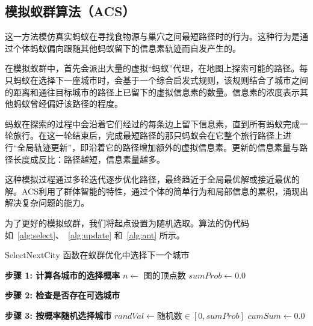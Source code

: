 \subsection{模拟蚁群算法（ACS）}

这一方法模仿真实蚂蚁在寻找食物源与巢穴之间最短路径时的行为。这种行为是通过个体蚂蚁偏向跟随其他蚂蚁留下的信息素轨迹而自发产生的。\cite{dorigo1997ant}

在模拟蚁群中，首先会派出大量的虚拟``蚂蚁''代理，在地图上探索可能的路径。每只蚂蚁在选择下一座城市时，会基于一个综合启发式规则，该规则结合了城市之间的距离和通往目标城市的路径上已留下的虚拟信息素的数量。信息素的浓度表示其他蚂蚁曾经偏好该路径的程度。

蚂蚁在探索的过程中会沿着它们经过的每条边上留下信息素，直到所有蚂蚁完成一轮旅行。在这一轮结束后，完成最短路径的那只蚂蚁会在它整个旅行路径上进行``全局轨迹更新''，即沿着它的路径增加额外的虚拟信息素。更新的信息素量与路径长度成反比：路径越短，信息素量越多。

这种模拟过程通过多轮迭代逐步优化路径，最终趋近于全局最优解或接近最优的解。ACS利用了群体智能的特性，通过个体的简单行为和局部信息的累积，涌现出解决复杂问题的能力。

为了更好的模拟蚁群，我们将起点设置为随机选取。算法的伪代码如~\autoref{alg:select}、~\autoref{alg:update} 和~\autoref{alg:ant} 所示。

\begin{algorithm}[htbp]
    \SetAlgoLined
    \caption{SelectNextCity 函数在蚁群优化中选择下一个城市}
    \label{alg:select}
    \BlankLine
    \textbf{步骤 1: 计算各城市的选择概率}\;
    $n \leftarrow$ 图的顶点数\;
    $sumProb \leftarrow 0.0$\;
    
    \textbf{步骤 2: 检查是否存在可选城市}\;
    
    \textbf{步骤 3: 按概率随机选择城市}\;
    $randVal \leftarrow \text{随机数} \in [0, sumProb]$\;
    $cumSum \leftarrow 0.0$\;
    
    
    \;
    
    \end{algorithm}

